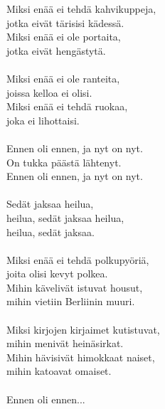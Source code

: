 
Miksi enää ei tehdä kahvikuppeja, \\ jotka eivät tärisisi kädessä. \\ Miksi enää ei ole portaita, \\ jotka eivät hengästytä. \\ \hspace{10mm} \\ Miksi enää ei ole ranteita, \\ joissa kelloa ei olisi. \\ Miksi enää ei tehdä ruokaa, \\ joka ei lihottaisi. \\ \hspace{10mm} \\ Ennen oli ennen, ja nyt on nyt. \\ On tukka päästä lähtenyt. \\ Ennen oli ennen, ja nyt on nyt. \\ \hspace{10mm} \\ Sedät jaksaa heilua, \\ heilua, sedät jaksaa heilua, \\ heilua, sedät jaksaa. \\ \hspace{10mm} \\ Miksi enää ei tehdä polkupyöriä, \\ joita olisi kevyt polkea. \\ Mihin kävelivät istuvat housut, \\ mihin vietiin Berliinin muuri. \\ \hspace{10mm} \\ Miksi kirjojen kirjaimet kutistuvat, \\ mihin menivät heinäsirkat. \\ Mihin hävisivät himokkaat naiset, \\ mihin katoavat omaiset. \\ \hspace{10mm} \\ Ennen oli ennen...